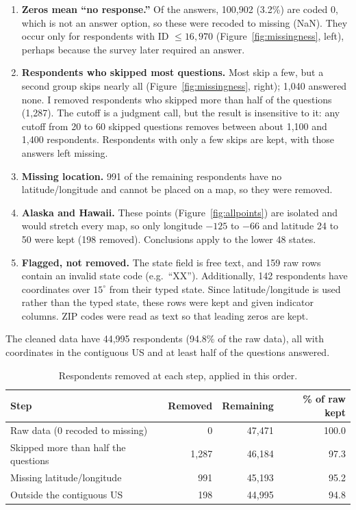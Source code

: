 \documentclass[10pt,letterpaper]{article}
\begin{document}
\begin{enumerate}
\item \textbf{Zeros mean ``no response.''} Of the answers, 100{,}902 (3.2\%) are coded 0, which is not an answer option, so these were recoded to missing (NaN). They occur only for respondents with ID $\le 16{,}970$ (Figure~\ref{fig:missingness}, left), perhaps because the survey later required an answer.
\item \textbf{Respondents who skipped most questions.} Most skip a few, but a second group skips nearly all (Figure~\ref{fig:missingness}, right); 1{,}040 answered none. I removed respondents who skipped more than half of the questions (1{,}287). The cutoff is a judgment call, but the result is insensitive to it: any cutoff from 20 to 60 skipped questions removes between about 1{,}100 and 1{,}400 respondents. Respondents with only a few skips are kept, with those answers left missing.
\item \textbf{Missing location.} 991 of the remaining respondents have no latitude/longitude and cannot be placed on a map, so they were removed.
\item \textbf{Alaska and Hawaii.} These points (Figure~\ref{fig:allpoints}) are isolated and would stretch every map, so only longitude $-125$ to $-66$ and latitude 24 to 50 were kept (198 removed). Conclusions apply to the lower 48 states.
\item \textbf{Flagged, not removed.} The state field is free text, and 159 raw rows contain an invalid state code (e.g.\ ``XX''). Additionally, 142 respondents have coordinates over $15^\circ$ from their typed state. Since latitude/longitude is used rather than the typed state, these rows were kept and given indicator columns. ZIP codes were read as text so that leading zeros are kept.
\end{enumerate}

The cleaned data have 44{,}995 respondents (94.8\% of the raw data), all with coordinates in the contiguous US and at least half of the questions answered.

\begin{table}[h]
\centering
\small
\begin{tabular}{lrrr}
\hline
Step & Removed & Remaining & \% of raw kept \\
\hline
Raw data (0 recoded to missing) & 0 & 47,471 & 100.0 \\
Skipped more than half the questions & 1,287 & 46,184 & 97.3 \\
Missing latitude/longitude & 991 & 45,193 & 95.2 \\
Outside the contiguous US & 198 & 44,995 & 94.8 \\
\hline
\end{tabular}
\caption{Respondents removed at each step, applied in this order.}
\label{tab:cleaning}
\end{table}
\end{document}
